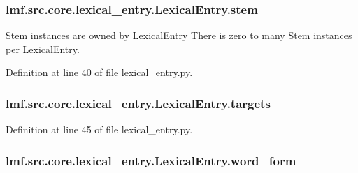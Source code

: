 \hypertarget{classlmf_1_1src_1_1core_1_1lexical__entry_1_1_lexical_entry_a381ed307ce61e5ae137abc94e45be36a}{
\subsubsection[{stem}]{\setlength{\rightskip}{0pt plus 5cm}lmf.\+src.\+core.\+lexical\+\_\+entry.\+Lexical\+Entry.\+stem}}\label{classlmf_1_1src_1_1core_1_1lexical__entry_1_1_lexical_entry_a381ed307ce61e5ae137abc94e45be36a}


Stem instances are owned by \hyperlink{classlmf_1_1src_1_1core_1_1lexical__entry_1_1_lexical_entry}{Lexical\+Entry} There is zero to many Stem instances per \hyperlink{classlmf_1_1src_1_1core_1_1lexical__entry_1_1_lexical_entry}{Lexical\+Entry}. 



Definition at line 40 of file lexical\+\_\+entry.\+py.

\hypertarget{classlmf_1_1src_1_1core_1_1lexical__entry_1_1_lexical_entry_aaf11d999bc91a5cf161fd4ce0ca3319b}{
\subsubsection[{targets}]{\setlength{\rightskip}{0pt plus 5cm}lmf.\+src.\+core.\+lexical\+\_\+entry.\+Lexical\+Entry.\+targets}}\label{classlmf_1_1src_1_1core_1_1lexical__entry_1_1_lexical_entry_aaf11d999bc91a5cf161fd4ce0ca3319b}


Definition at line 45 of file lexical\+\_\+entry.\+py.

\hypertarget{classlmf_1_1src_1_1core_1_1lexical__entry_1_1_lexical_entry_a6418f42441f0d6d25449270298010d03}{
\subsubsection[{word\+\_\+form}]{\setlength{\rightskip}{0pt plus 5cm}lmf.\+src.\+core.\+lexical\+\_\+entry.\+Lexical\+Entry.\+word\+\_\+form}}\label{classlmf_1_1src_1_1core_1_1lexical__entry_1_1_lexical_entry_a6418f42441f0d6d25449270298010d03}


